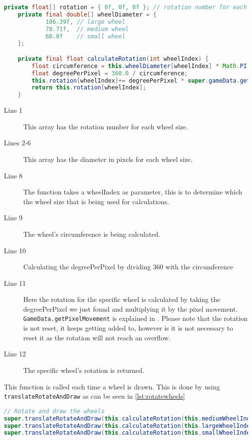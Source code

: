 \begin{lstlisting}[language=java,firstnumber=1,caption={Calculating the wheel rotation.},label=lst:calcrotate]
    private float[] rotation = { 0f, 0f, 0f }; // rotation number for each wheel size
    private final double[] wheelDiameter = {
            106.39f, // large wheel
            78.71f,  // medium wheel
            60.8f    // small wheel
    };

    private final float calculateRotation(int wheelIndex) {    
        float circumference = this.wheelDiameter[wheelIndex] * Math.PI;
        float degreePerPixel = 360.0 / circumference;
        this.rotation[wheelIndex]+= degreePerPixel * super.gameData.getPixelMovement();
        return this.rotation[wheelIndex];
    }
\end{lstlisting}

\begin{description}
\item[Line 1] This array has the rotation number for each wheel size.
\item[Lines 2-6] This array has the diameter in pixels for each wheel size. 
\item[Line 8] The function takes a wheelIndex as parameter, this is to determine which the wheel size that is being used for calculations. 
\item[Line 9] The wheel's circumference is being calculated.
\item[Line 10] Calculating the degreePerPixel by dividing 360 with the circumference
\item[Line 11] Here the rotation for the specific wheel is calculated by taking the degreePerPixel we just found and multiplying it by the pixel movement. \lstinline|GameData.getPixelMovement| is explained in . Please note that the rotation is not reset, it keeps getting added to, however is it is not necessary to reset it as the rotation will not reach an overflow.
\item[Line 12] The specific wheel's rotation is returned. 
\end{description}

This function is called each time a wheel is drawn. This is done by using \lstinline|translateRotateAndDraw| as can be seen in \autoref{lst:rotatewheels}

\begin{lstlisting}[language=java,firstnumber=1,caption={Rotating and drawing the wheels.},label=lst:rotatewheels]
	// Rotate and draw the wheels
super.translateRotateAndDraw(this.calculateRotation(this.mediumWheelIndex), this.mediumWheel);
super.translateRotateAndDraw(this.calculateRotation(this.largeWheelIndex), this.largeWheel);
super.translateRotateAndDraw(this.calculateRotation(this.smallWheelIndex), this.smallWheel);
\end{lstlisting}

